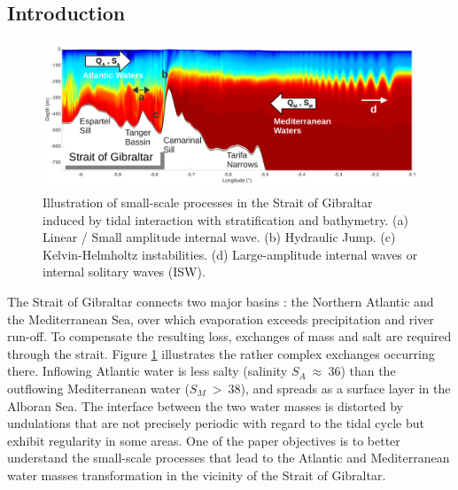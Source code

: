 


\subsection{Introduction}
\begin{figure}[!h]
 \centering
 \includegraphics[width=1\textwidth]{./GBR2D/figure1.png}
 \caption{Illustration of small-scale processes in the Strait of Gibraltar induced by tidal interaction with stratification and bathymetry. (a) Linear / Small amplitude internal wave. (b) Hydraulic Jump. (c) Kelvin-Helmholtz instabilities. (d) Large-amplitude internal waves or internal solitary waves (ISW).}
\label{scheme_GBR}
\end{figure}

The Strait of Gibraltar connects two major basins : the Northern Atlantic and the Mediterranean Sea, over which evaporation exceeds precipitation and river run-off. To compensate the resulting loss, exchanges of mass and salt are required through the strait. Figure \ref{scheme_GBR} illustrates the rather complex  exchanges occurring there. %
Inflowing Atlantic water is less salty (salinity $S_A\ \approx\ 36$) than the outflowing Mediterranean water ($S_M\ >\ 38$), and spreads as a surface layer in the Alboran Sea. The interface between the two water masses is distorted by undulations that are not precisely periodic with regard to the tidal cycle but exhibit regularity in some areas.  One of the paper objectives is to better understand the small-scale processes that lead to the Atlantic and Mediterranean water masses transformation in the vicinity of the Strait of Gibraltar.

